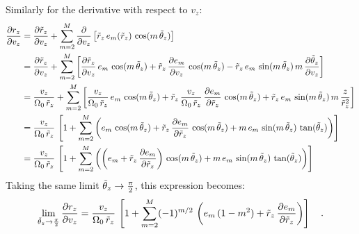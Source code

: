Similarly for the derivative with respect to $v_z$:
\begin{align}
    \frac{\partial r_z}{\partial v_z} &=
        \frac{\partial \tilde{r}_z}{\partial v_z} +
        \sum_{m=2}^{M} \frac{\partial}{\partial v_z}
            \left[\tilde{r}_z \, e_m(\tilde{r}_z) \, \cos(m \, \tilde{\theta}_z)\right]\\
    &= \frac{\partial \tilde{r}_z}{\partial v_z} +
        \sum_{m=2}^{M} \left[
        \frac{\partial \tilde{r}_z}{\partial v_z} \, e_m \, \cos(m \, \tilde{\theta}_z)
        + \tilde{r}_z \, \frac{\partial e_m}{\partial v_z} \, \cos(m \, \tilde{\theta}_z)
        - \tilde{r}_z \, e_m \, \sin(m \, \tilde{\theta}_z) \, m \,\frac{\partial \tilde{\theta}_z}{\partial v_z}\right]\\
    &= \frac{v_z}{\Omega_0\,\tilde{r}_z} + \sum_{m=2}^{M} \left[
        \frac{v_z}{\Omega_0\,\tilde{r}_z} \, e_m \, \cos(m \, \tilde{\theta}_z) +
        \tilde{r}_z \, \frac{v_z}{\Omega_0\,\tilde{r}_z} \, \frac{\partial e_m}{\partial \tilde{r}_z} \, \cos(m \, \tilde{\theta}_z) +
        \tilde{r}_z \, e_m \, \sin(m \, \tilde{\theta}_z) \, m \, \frac{z}{\tilde{r}_z^2}\right]\\
    &= \frac{v_z}{\Omega_0 \, \tilde{r}_z} \, \left[
        1 + \sum_{m=2}^{M} \left(
            e_m \, \cos(m \, \tilde{\theta}_z) +
                \tilde{r}_z \, \frac{\partial e_m}{\partial \tilde{r}_z} \, \cos(m \, \tilde{\theta}_z) +
                m \, e_m \, \sin(m \, \tilde{\theta}_z) \, \tan(\tilde{\theta}_z)
        \right)
    \right]\\
    &= \frac{v_z}{\Omega_0 \, \tilde{r}_z} \, \left[
        1 + \sum_{m=2}^{M} \left(
            \left(e_m + \tilde{r}_z \, \frac{\partial e_m}{\partial \tilde{r}_z}\right) \,
                \cos(m \, \tilde{\theta}_z) +
            m \, e_m \, \sin(m \, \tilde{\theta}_z) \, \tan(\tilde{\theta}_z)
        \right)
    \right]
\end{align}
Taking the same limit $\tilde{\theta}_z \to \frac{\pi}{2}$, this expression becomes:
\begin{equation}
    \lim_{\tilde{\theta}_z \to \frac{\pi}{2}} \frac{\partial r_z}{\partial v_z} =
        \frac{v_z}{\Omega_0 \, \tilde{r}_z} \, \left[
            1 + \sum_{m=2}^{M} (-1)^{m/2} \,
                \left(e_m\,(1 - m^2) + \tilde{r}_z \, \frac{\partial e_m}{\partial \tilde{r}_z}\right)
        \right] \quad .
\end{equation}

